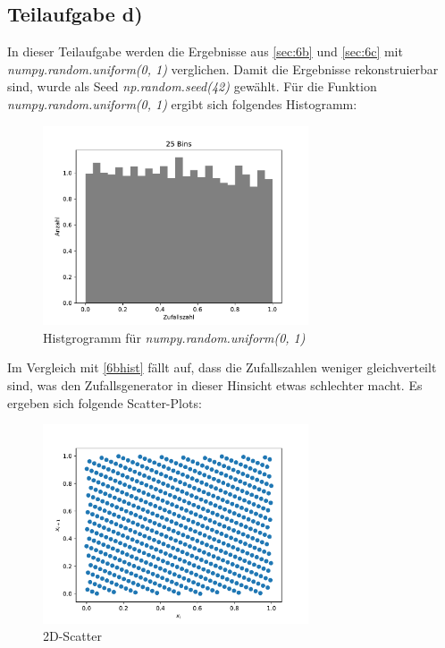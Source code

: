 \subsection{Teilaufgabe d)}
In dieser Teilaufgabe werden die Ergebnisse aus \ref{sec:6b} und \ref{sec:6c} mit \textit{numpy.random.uniform(0, 1)} verglichen.
Damit die Ergebnisse rekonstruierbar sind, wurde als Seed \textit{np.random.seed(42)} gewählt.
Für die Funktion \textit{numpy.random.uniform(0, 1)} ergibt sich folgendes Histogramm:
\begin{figure}[H]
  \centering
  \includegraphics[width=0.7\textwidth]{Aufgabe06/Teilaufgabe_d)_Histogramm.pdf}
  \caption{Histgrogramm für \textit{numpy.random.uniform(0, 1)}}
  \label{6dhist}
\end{figure}
Im Vergleich mit \ref{6bhist} fällt auf, dass die Zufallszahlen weniger gleichverteilt sind, was den Zufallsgenerator in dieser Hinsicht etwas schlechter macht.
Es ergeben sich folgende Scatter-Plots:
\begin{figure}[H]
  \centering
  \includegraphics[width=0.7\textwidth]{Aufgabe06/Teilaufgabe_c)_2D-Scatter.pdf}
  \caption{2D-Scatter}
  \label{fig:2dscatterc}
\end{figure}

